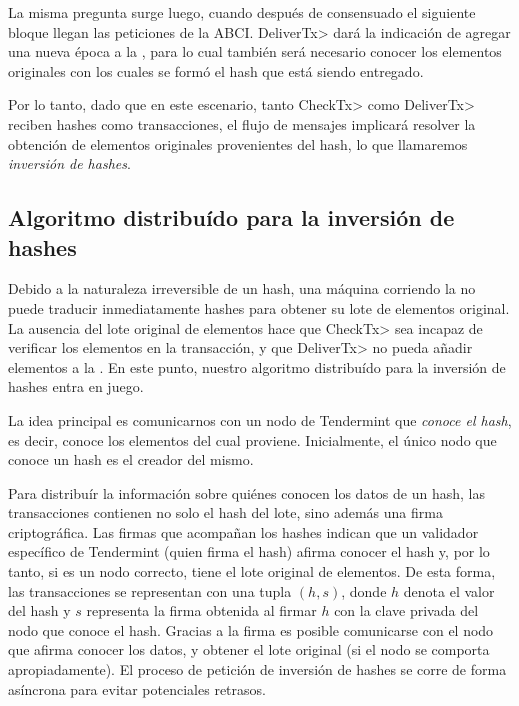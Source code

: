 %

La misma pregunta surge luego,
cuando después de consensuado el siguiente bloque llegan las peticiones de la ABCI.
%
\<DeliverTx> dará la indicación de agregar una nueva época a la \setchain, para lo cual también
será necesario conocer los elementos originales con los cuales se formó el hash que está siendo entregado.

Por lo tanto, dado que en este escenario, tanto \<CheckTx> como \<DeliverTx> reciben hashes como transacciones,
el flujo de mensajes implicará resolver la obtención de elementos originales provenientes del hash, lo que llamaremos
\textit{inversión de hashes}.


\subsection{Algoritmo distribuído para la inversión de hashes}

%
%
Debido a la naturaleza irreversible de un hash, una máquina corriendo la \setchain no puede traducir
inmediatamente hashes para obtener su lote de elementos original.
%
La ausencia del lote original de elementos hace que \<CheckTx> sea incapaz de verificar los elementos
en la transacción, y que \<DeliverTx> no pueda añadir elementos a la \setchain.
%
En este punto, nuestro algoritmo distribuído para la inversión de hashes entra en juego.
%

La idea principal es comunicarnos con un nodo de Tendermint que \textit{conoce el hash}, es decir,
conoce los elementos del cual proviene.
%
Inicialmente, el único nodo que conoce un hash es el creador del mismo.
%

Para distribuír la información sobre quiénes conocen los datos de un hash, las transacciones contienen
no solo el hash del lote, sino además una firma criptográfica.
%
Las firmas que acompañan los hashes indican que un validador específico de Tendermint
(quien firma el hash) afirma conocer el hash y, por lo tanto, si es un nodo correcto,
tiene el lote original de elementos.
%
De esta forma, las transacciones se representan con una tupla $(h, s)$, donde $h$ denota
el valor del hash y $s$ representa la firma obtenida al firmar $h$ con la clave privada
del nodo que conoce el hash.
%
Gracias a la firma es posible comunicarse con el nodo que afirma conocer los datos, y obtener
el lote original (si el nodo se comporta apropiadamente).
%
El proceso de petición de inversión de hashes se corre de forma asíncrona para evitar potenciales
retrasos.

